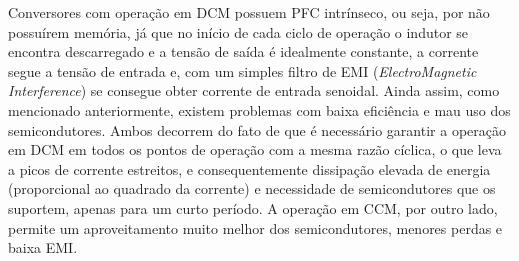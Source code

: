 \documentclass[
        12pt,
        openany, %
        oneside, %
        a4paper,			
        english,			
        brazil
        ]{abntbibufjf}
\begin{document}









Conversores com operação em DCM possuem PFC intrínseco, ou seja, por não possuírem memória, já que no início de cada ciclo de operação o indutor se encontra descarregado e a tensão de saída é idealmente constante, a corrente segue a tensão de entrada e, com um simples filtro de EMI (\textit{ElectroMagnetic Interference}) se consegue obter corrente de entrada senoidal. Ainda assim, como mencionado anteriormente, existem problemas com baixa eficiência e mau uso dos semicondutores. Ambos decorrem do fato de que é necessário garantir a operação em DCM em todos os pontos de operação com a mesma razão cíclica, o que leva a picos de corrente estreitos, e consequentemente dissipação elevada de energia (proporcional ao quadrado da corrente) e necessidade de semicondutores que os suportem, apenas para um curto período. A operação em CCM, por outro lado, permite um aproveitamento muito melhor dos semicondutores, menores perdas e baixa EMI.
\end{document}

